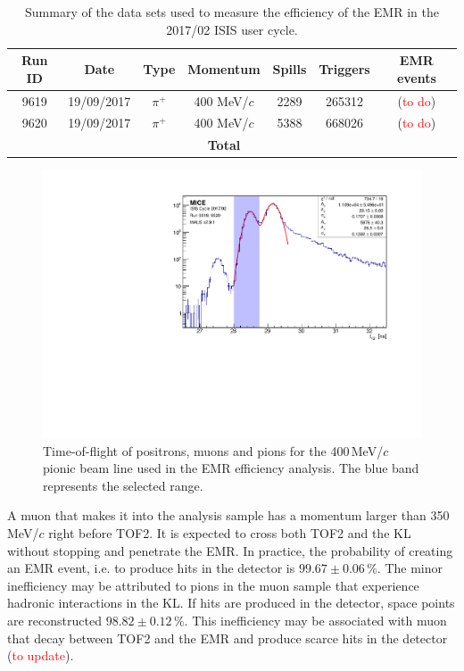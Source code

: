 \begin{table}
	\centering
	\begin{tabular}{c|c|c|c|c|c|c}
		Run ID & Date & Type & Momentum & Spills & Triggers & EMR events \\
		\hline
		9619 & 19/09/2017 & $\pi^+$ & 400 MeV/$c$ & 2289 & 265312 & (\textcolor{red}{to do}) \\
		9620 & 19/09/2017 & $\pi^+$ & 400 MeV/$c$ & 5388 & 668026 & (\textcolor{red}{to do}) \\
		\hline
		\multicolumn{3}{c}{} & \textbf{Total} &  &  & 
	\end{tabular}
	\caption{Summary of the data sets used to measure the efficiency of the EMR in the 2017/02 ISIS user cycle.}
	\label{tab:emr_eff_data_sets}
\end{table}

    \begin{figure}
    	\begin{center}
    		\includegraphics[width=0.6\columnwidth]{tof12.pdf}  		
    		\caption{Time-of-flight of positrons, muons and pions for the 400\,MeV/$c$ pionic beam line used in the EMR efficiency analysis. The blue band represents the selected range.}
    		\label{fig:emr_eff_tof}
    	\end{center}
    \end{figure}

A muon that makes it into the analysis sample has a momentum larger than 350\,MeV/$c$ right before TOF2. It is expected to cross both TOF2 and the KL without stopping and penetrate the EMR. In practice, the probability of creating an EMR event, i.e. to produce hits in the detector is $99.67\pm0.06\,\%$. The minor inefficiency may be attributed to pions in the muon sample that experience hadronic interactions in the KL. If hits are produced in the detector, space points are reconstructed $98.82\pm0.12\,\%$. This inefficiency may be associated with muon that decay between TOF2 and the EMR and produce scarce hits in the detector (\textcolor{red}{to update}).

